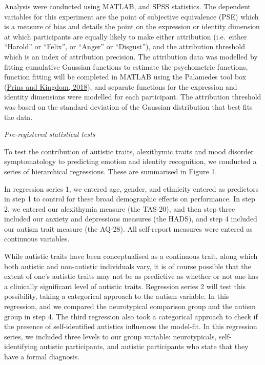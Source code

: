 \documentclass[
]{article}
\begin{document}
Analysis were conducted using MATLAB, and SPSS statistics. The dependent variables for this experiment are the point of subjective equivalence (PSE) which is a measure of bias and details the point on the expression or identity dimension at which participants are equally likely to make either attribution (i.e.~either ``Harold'' or ``Felix'', or ``Anger'' or ``Disgust''), and the attribution threshold which is an index of attribution precision. The attribution data was modelled by fitting cumulative Gaussian functions to estimate the psychometric functions, function fitting will be completed in MATLAB using the Palamedes tool box (\protect\hyperlink{ref-prins2018a}{Prins and Kingdom, 2018}), and separate functions for the expression and identity dimensions were modelled for each participant. The attribution threshold was based on the standard deviation of the Gaussian distribution that best fits the data.

\emph{Pre-registered statistical tests}

To test the contribution of autistic traits, alexithymic traits and mood disorder symptomatology to predicting emotion and identity recognition, we conducted a series of hierarchical regressions. These are summarised in Figure 1.

In regression series 1, we entered age, gender, and ethnicity entered as predictors in step 1 to control for these broad demographic effects on performance. In step 2, we entered our alexithymia measure (the TAS-20), and then step three included our anxiety and depressions measures (the HADS), and step 4 included our autism trait measure (the AQ-28). All self-report measures were entered as continuous variables.

While autistic traits have been conceptualised as a continuous trait, along which both autistic and non-autistic individuals vary, it is of course possible that the extent of one's autistic traits may not be as predictive as whether or not one has a clinically significant level of autistic traits. Regression series 2 will test this possibility, taking a categorical approach to the autism variable. In this regression, and we compared the neurotypical comparison group and the autism group in step 4.
The third regression also took a categorical approach to check if the presence of self-identified autistics influences the model-fit. In this regression series, we included three levels to our group variable: neurotypicals, self-identifying autistic participants, and autistic participants who state that they have a formal diagnosis.
\end{document}
